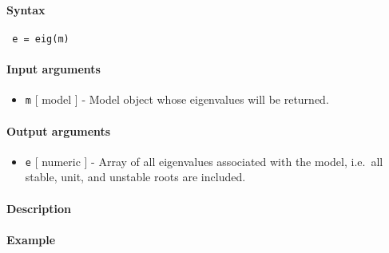 


	\paragraph{Syntax}
 
 \begin{verbatim}
 e = eig(m)
 \end{verbatim}
 
 \paragraph{Input arguments}
 
 \begin{itemize}
 \item
   \texttt{m} {[} model {]} - Model object whose eigenvalues will be
   returned.
 \end{itemize}
 
 \paragraph{Output arguments}
 
 \begin{itemize}
 \item
   \texttt{e} {[} numeric {]} - Array of all eigenvalues associated with
   the model, i.e.~all stable, unit, and unstable roots are included.
 \end{itemize}
 
 \paragraph{Description}
 
 \paragraph{Example}


